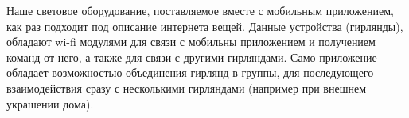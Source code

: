 Наше световое оборудование, поставляемое вместе с мобильным приложением, как раз подходит под описание интернета вещей. Данные устройства (гирлянды), обладают wi-fi модулями для связи с мобильны приложением и получением команд от него, а также для связи с другими гирляндами. Само приложение обладает возможностью объединения гирлянд в группы, для последующего взаимодействия сразу с несколькими гирляндами (например при внешнем украшении дома).
